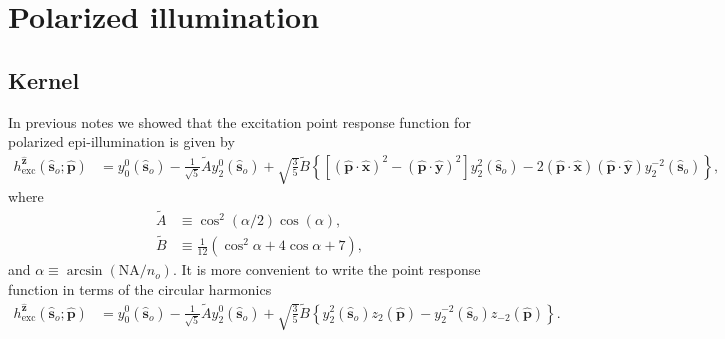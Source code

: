 \documentclass[11pt]{article}
\providecommand{\so}[1]{\mathbf{\hat{s}}_o}
\providecommand{\mh}[1]{\mathbf{\hat{#1}}}
\begin{document}
\section{Polarized illumination}
\subsection{Kernel}
In previous notes we showed that the excitation point response function for
polarized epi-illumination is given by
\begin{align}
  h^{\mh{z}}_{\text{exc}}(\so{}; \mh{p}) &= y_0^0(\so{}) - \frac{1}{\sqrt{5}}\tilde{A}y_2^0(\so{}) + \sqrt{\frac{3}{5}}\tilde{B}\left\{[(\mh{p}\cdot\mh{x})^2 - (\mh{p}\cdot\mh{y})^2]y_2^2(\so{}) - 2(\mh{p}\cdot\mh{x})(\mh{p}\cdot\mh{y})y_2^{-2}(\so{})\right\}, \label{eq:genpsf}
\end{align}
where
\begin{subequations}
\begin{align}
  \tilde{A} &\equiv \cos^2(\alpha/2)\cos(\alpha),\\
  \tilde{B} &\equiv \frac{1}{12}(\cos^2\alpha + 4\cos\alpha + 7),
\end{align}\label{eq:coefficients}%
\end{subequations}
and $\alpha \equiv \arcsin(\text{NA}/n_o)$. It is more convenient to write the point response function in terms of the circular harmonics
\begin{align}
    h^{\mh{z}}_{\text{exc}}(\so{}; \mh{p}) &= y_0^0(\so{}) - \frac{1}{\sqrt{5}}\tilde{A}y_2^0(\so{}) + \sqrt{\frac{3}{5}}\tilde{B}\left\{y_2^2(\so{})z_2(\mh{p}) - y_2^{-2}(\so{})z_{-2}(\mh{p})\right\}.
\end{align}
\end{document}
